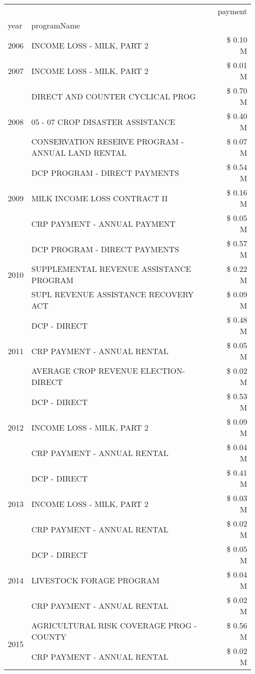 \begin{tabular}{llr}
\toprule
 &  & payment \\
year & programName &  \\
\midrule
2006 & INCOME LOSS - MILK, PART 2 & \$ 0.10 M \\
\cline{1-3}
2007 & INCOME LOSS - MILK, PART 2 & \$ 0.01 M \\
\cline{1-3}
\multirow[t]{3}{*}{2008} & DIRECT AND COUNTER CYCLICAL PROG & \$ 0.70 M \\
 & 05 - 07 CROP DISASTER ASSISTANCE & \$ 0.40 M \\
 & CONSERVATION RESERVE PROGRAM - ANNUAL LAND RENTAL & \$ 0.07 M \\
\cline{1-3}
\multirow[t]{3}{*}{2009} & DCP PROGRAM - DIRECT PAYMENTS & \$ 0.54 M \\
 & MILK INCOME LOSS CONTRACT II & \$ 0.16 M \\
 & CRP PAYMENT - ANNUAL PAYMENT & \$ 0.05 M \\
\cline{1-3}
\multirow[t]{3}{*}{2010} & DCP PROGRAM - DIRECT PAYMENTS & \$ 0.57 M \\
 & SUPPLEMENTAL REVENUE ASSISTANCE PROGRAM & \$ 0.22 M \\
 & SUPL REVENUE ASSISTANCE RECOVERY ACT & \$ 0.09 M \\
\cline{1-3}
\multirow[t]{3}{*}{2011} & DCP - DIRECT & \$ 0.48 M \\
 & CRP PAYMENT - ANNUAL RENTAL & \$ 0.05 M \\
 & AVERAGE CROP REVENUE ELECTION-DIRECT & \$ 0.02 M \\
\cline{1-3}
\multirow[t]{3}{*}{2012} & DCP - DIRECT & \$ 0.53 M \\
 & INCOME LOSS - MILK, PART 2 & \$ 0.09 M \\
 & CRP PAYMENT - ANNUAL RENTAL & \$ 0.04 M \\
\cline{1-3}
\multirow[t]{3}{*}{2013} & DCP - DIRECT & \$ 0.41 M \\
 & INCOME LOSS - MILK, PART 2 & \$ 0.03 M \\
 & CRP PAYMENT - ANNUAL RENTAL & \$ 0.02 M \\
\cline{1-3}
\multirow[t]{3}{*}{2014} & DCP - DIRECT & \$ 0.05 M \\
 & LIVESTOCK FORAGE PROGRAM & \$ 0.04 M \\
 & CRP PAYMENT - ANNUAL RENTAL & \$ 0.02 M \\
\cline{1-3}
\multirow[t]{3}{*}{2015} & AGRICULTURAL RISK COVERAGE PROG - COUNTY & \$ 0.56 M \\
 & CRP PAYMENT - ANNUAL RENTAL & \$ 0.02 M \\

\end{tabular}
